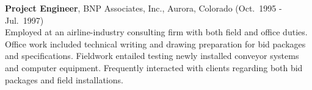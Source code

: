 

\begin{minipage}{\minipagewidth}
\textbf{Project Engineer}, BNP Associates, Inc., Aurora, Colorado (Oct.~1995 - Jul.~1997) \\
%
Employed at an airline-industry consulting firm with both field and
office duties. Office work included technical writing and drawing
preparation for bid packages and specifications.  Fieldwork entailed
testing newly installed conveyor systems and computer
equipment. Frequently interacted with clients regarding both bid
packages and field installations.
\end{minipage}\vspace{\parskip}
